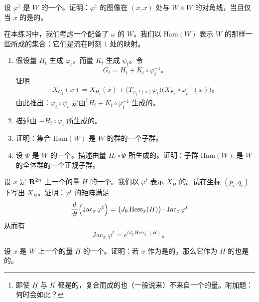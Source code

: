 \begin{exercise}\label{ex:ch14-006-graph-diagonal-transverse}
设 $\varphi^1$ 是 $W$ 的一个\trHamiltonian\trDiffeomorphism。证明：$\varphi^1$ 的图像在 $(x,x)$ 处与 $W\times W$ 的对角线\trTransverse，当且仅当 $x$ 的\trTrajectory{}是\trNondegenerate{}的。
\end{exercise}

\begin{exercise}\label{ex:ch14-007-hamiltonian-diffeomorphism-group}
在本练习中，我们考虑一个配备了\trSymplecticForm{} $\omega$ 的\trCompact\trManifold{} $W$。我们以 $\mathrm{Ham}(W)$ 表示 $W$ 的那样一些\trDiffeomorphism{}所成的集合：它们是\trHamiltonian{}流在时刻 1 处的映射。

\begin{enumerate}[label=(\arabic*)]
\item 假设\trHamiltonian{}量 $H_t$ 生成\trIsotopy{} $\varphi_t$，而\trHamiltonian{}量 $K_t$ 生成 $\psi_t$。令
\[
G_t=H_t+K_t\circ\varphi_t^{-1}\text{。}
\]
证明
\[
X_{G_t}(x)=X_{H_t}(x)+\bigl(T_{\varphi_t^{-1}(x)}\varphi_t\bigr)\bigl(X_{K_t}\circ\varphi_t^{-1}(x)\bigr)\text{。}
\]
由此推出：$\varphi_t\circ\psi_t$ 是由\trHamiltonian\footnote{即使 $H$ 与 $K$ 都是\trAutonomous{}的，复合而成的\trHamiltonian\trIsotopy{}也（一般说来）不来自一个\trAutonomous{}的\trHamiltonian{}量。附加题：何时会如此？}$H_t+K_t\circ\varphi_t^{-1}$ 生成的\trHamiltonian\trIsotopy。
\item 描述由 $-H_t\circ\varphi_t$ 所生成的\trHamiltonian\trIsotopy。
\item 证明：集合 $\mathrm{Ham}(W)$ 是 $W$ 的\trSymplectic{}\trDiffeomorphism{}群的一个子群。
\item 设 $\varPhi$ 是 $W$ 的一个\trSymplectic\trDiffeomorphism。描述由\trHamiltonian{}量 $H_t\circ\varPhi$ 所生成的\trHamiltonian\trIsotopy。证明：子群 $\mathrm{Ham}(W)$ 是 $W$ 的全体\trSymplectic{}\trDiffeomorphism{}群的一个正规子群。
\end{enumerate}
\end{exercise}

\begin{exercise}\label{ex:ch14-008-jacobian-flow}
设 $x$ 是 $\mathbf{R}^{2n}$ 上一个\trAutonomous{}的\trHamiltonian{}量 $H$ 的一个\trNondegenerate\trCriticalPoint。我们以 $\varphi^t$ 表示 $X_H$ 的\trFlow。试在坐标 $(p_i,q_i)$ 下写出 $X_H$。证明：$\varphi^t$ 的\trJacobi{}矩阵满足
\[
\frac{d}{dt}\Bigl(\operatorname{Jac}_x\varphi^t\Bigr)=\bigl(J_0\operatorname{Hess}_x(H)\bigr)\cdot\operatorname{Jac}_x\varphi^t
\]
从而有
\[
\operatorname{Jac}_x\varphi^t=e^{tJ_0\operatorname{Hess}_x(H)}\text{。}
\]

设 $x$ 是\trSymplectic\trManifold{} $W$ 上一个\trAutonomous{}的\trHamiltonian{}量 $H$ 的一个\trCriticalPoint。证明：若 $x$ 作为\trPeriodic\trTrajectory{}是\trNondegenerate{}的，那么它作为 $H$ 的\trCriticalPoint{}也是\trNondegenerate{}的。
\end{exercise}

